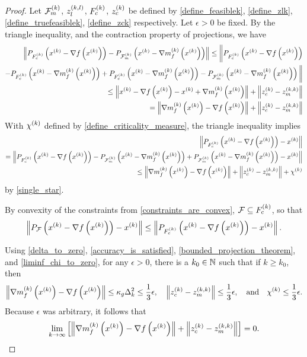\begin{proof}
Let 
${\mathcal F_m^{(k)}}$, ${z_l^{(k, l)}}$, $ {F_c^{(k)}} $, ${z_c^{(k)}}$
be defined by 
\cref{define_feasiblek}, \cref{define_zlk}, \cref{define_truefeasiblek}, \cref{define_zck}
respectively.
Let $\epsilon > 0$ be fixed.
By the triangle inequality, and the contraction property of projections, we have
\begin{align}\left \|
 P_{{F_c^{(k)}}}\left(x^{(k)} - \nabla f\left(x^{(k)}\right)\right)
-P_{{\mathcal F_m^{(k)}}}\left(x^{(k)} - {\nabla m_f^{(k)}\left(x^{(k)}\right)} \right)
\right\| 
\le 
\bigg \|
 P_{{F_c^{(k)}}}\left(x^{(k)} - \nabla f\left(x^{(k)}\right)\right) \nonumber \\
-P_{{F_c^{(k)}}}\left(x^{(k)} - {\nabla m_f^{(k)}\left(x^{(k)}\right)} \right)
+P_{{F_c^{(k)}}}\left(x^{(k)} - {\nabla m_f^{(k)}\left(x^{(k)}\right)} \right)
-P_{{\mathcal F_m^{(k)}}}\left(x^{(k)} - {\nabla m_f^{(k)}\left(x^{(k)}\right)} \right)
\bigg\| \nonumber \\
\le \left\|
x^{(k)} - \nabla f\left(x^{(k)}\right) - x^{(k)} + {\nabla m_f^{(k)}\left(x^{(k)}\right)}
\right\| + \left\|{z_c^{(k)}} - {z_m^{(k, k)}}\right\| \nonumber \\
= \left\|{\nabla m_f^{(k)}\left(x^{(k)}\right)} - \nabla f\left(x^{(k)}\right)\right\| + \left\|{z_c^{(k)}} - {z_m^{(k, k)}}\right\| \label{single_star}
\end{align}
With ${\chi^{(k)}}$ defined by \cref{define_criticality_measure}, the triangle inequality implies
\begin{align*}
\left\|P_{{F_c^{(k)}}}\left(x^{(k)} - \nabla f\left(x^{(k)}\right)\right) - x^{(k)} \right\| \\
= \left\|
 P_{{F_c^{(k)}}}\left(x^{(k)} - \nabla f\left(x^{(k)}\right)\right)
-P_{{\mathcal F_m^{(k)}}}\left(x^{(k)} - {\nabla m_f^{(k)}\left(x^{(k)}\right)} \right)
+P_{{\mathcal F_m^{(k)}}}\left(x^{(k)} - {\nabla m_f^{(k)}\left(x^{(k)}\right)} \right)
- x^{(k)}\right\| \\
\le \left\|{\nabla m_f^{(k)}\left(x^{(k)}\right)} - \nabla f\left(x^{(k)}\right)\right\| + \left\|{z_c^{(k)}} - {z_m^{(k, k)}}\right\| + {\chi^{(k)}}
\end{align*}
by \cref{single_star}.

By convexity of the constraints from \cref{constraints_are_convex}, ${\mathcal F} \subseteq {F_c^{(k)}}$, so that
\begin{align*}
\left\|P_{{\mathcal F}}\left(x^{(k)} - \nabla f\left(x^{(k)}\right)\right) - x^{(k)} \right\| 
\le \left\|P_{{F_c^{(k)}}}\left(x^{(k)} - \nabla f\left(x^{(k)}\right)\right) - x^{(k)} \right\|.
\end{align*}

Using \cref{delta_to_zero}, \cref{accuracy_is_satisfied}, \cref{bounded_projection_theorem}, and \cref{liminf_chi_to_zero},
for any $\epsilon > 0$, there is a $k_0 \in \mathbb N$ such that if $k \ge k_0$, then
\begin{align*}
\left\|{\nabla m_f^{(k)}\left(x^{(k)}\right)} - \nabla f\left(x^{(k)}\right)\right\| \le \kappa_g \Delta_k^2 \le \frac 1 3 \epsilon,
\quad
\left\|{z_c^{(k)}} - {z_m^{(k, k)}}\right\| \le \frac 1 3 \epsilon,
\quad \textrm{and} \quad
{\chi^{(k)}} \le \frac 1 3 \epsilon.
\end{align*}
Because $\epsilon$ was arbitrary, it follows that
\begin{align*}
\lim_{k\to\infty} \left[\left\|{\nabla m_f^{(k)}\left(x^{(k)}\right)} - \nabla f\left(x^{(k)}\right)\right\| + \left\|{z_c^{(k)}} - {z_m^{(k, k)}}\right\|\right] = 0.
\end{align*}
\end{proof}

